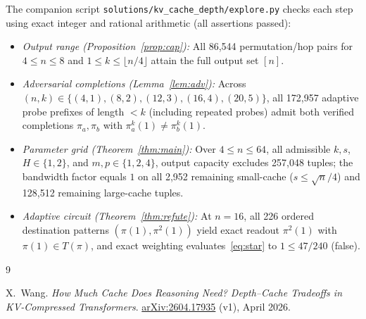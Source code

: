 \documentclass[11pt]{article}
\theoremstyle{plain}
\theoremstyle{definition}
\theoremstyle{remark}
\begin{document}
The companion script \texttt{solutions/kv\_cache\_depth/explore.py} checks each step using exact integer and rational arithmetic (all assertions passed):
\begin{itemize}[leftmargin=2em,itemsep=2pt,topsep=3pt]
\item \emph{Output range (Proposition~\ref{prop:cap}):} All 86,544 permutation/hop pairs for $4 \le n \le 8$ and $1 \le k \le \lfloor n/4 \rfloor$ attain the full output set $[n]$.
\item \emph{Adversarial completions (Lemma~\ref{lem:adv}):} Across $(n,k) \in \{(4,1),(8,2),(12,3),(16,4),(20,5)\}$, all 172,957 adaptive probe prefixes of length $< k$ (including repeated probes) admit both verified completions $\pi_a, \pi_b$ with $\pi_a^k(1) \neq \pi_b^k(1)$.
\item \emph{Parameter grid (Theorem~\ref{thm:main}):} Over $4 \le n \le 64$, all admissible $k, s$, $H \in \{1, 2\}$, and $m, p \in \{1, 2, 4\}$, output capacity excludes 257,048 tuples; the bandwidth factor equals $1$ on all 2,952 remaining small-cache ($s \le \sqrt{n}/4$) and 128,512 remaining large-cache tuples.
\item \emph{Adaptive circuit (Theorem~\ref{thm:refute}):} At $n = 16$, all 226 ordered destination patterns $(\pi(1), \pi^2(1))$ yield exact readout $\pi^2(1)$ with $\pi(1) \in T(\pi)$, and exact weighting evaluates~\eqref{eq:star} to $1 \le 47/240$ (false).
\end{itemize}

\begin{thebibliography}{9}

X.~Wang.
\emph{How Much Cache Does Reasoning Need? Depth--Cache Tradeoffs in KV-Compressed Transformers}.
\href{https://arxiv.org/abs/2604.17935}{arXiv:2604.17935} (v1), April 2026.

\end{thebibliography}
\end{document}
